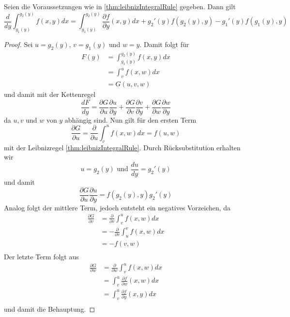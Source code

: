 \begin{theorem}
 Seien die Voraussetzungen wie in \ref{thm:leibnizIntegralRule} gegeben. Dann gilt
 \begin{equation}
  \frac{d}{dy}\int_{g_1(y)}^{g_2(y)}f(x,y) dx =\int_{g_1(y)}^{g_2(y)} \frac{\partial f}{\partial y}(x,y) dx + g_2'(y)f(g_2(y),y) - g_1'(y)f(g_1(y),y)
 \end{equation}
 \begin{proof}
  Sei $u = g_2(y)$, $v = g_1(y)$ und $w=y$. Damit folgt für 
  \[
  \begin{aligned}
       F(y) &=  \int_{g_1(y)}^{g_2(y)}f(x,y) dx\\
	    &=  \int_{v}^{u}f(x,w) dx\\
	    &= G(u,v,w)
  \end{aligned}
  \]
und damit mit der Kettenregel
\[
 \frac{dF}{dy} = \frac{\partial G}{\partial u}\frac{\partial u}{\partial y} + \frac{\partial G}{\partial v}\frac{\partial v}{\partial y}+ \frac{\partial G}{\partial w}\frac{\partial w}{\partial y}
\]
da $u, v$ und $w$ von $y$ abhängig sind.
Nun gilt für den ersten Term 
\[
  \frac{\partial G}{\partial u} = \frac{\partial}{\partial u} \int_v^u f(x,w)dx = f(u,w)
\]
mit der Leibnizregel \ref{thm:leibnizIntegralRule}. Durch Rücksubstitution erhalten wir
\[
 u = g_2(y) \text{ und } \frac{du}{dy} = g_2'(y)
\]
und damit 
\[
  \frac{\partial G}{\partial u}\frac{\partial u}{\partial y}  = f(g_2(y),y)g_2'(y)
\]
Analog folgt der mittlere Term, jedoch entsteht ein negatives Vorzeichen, da
\[
\begin{aligned}
  \frac{\partial G}{\partial v} &= \frac{\partial}{\partial v} \int_v^u f(x,w)dx \\
				&= -\frac{\partial}{\partial v} \int_u^v f(x,w)dx \\
				&= -f(v,w) \\
\end{aligned}
\]
Der letzte Term folgt aus
\[
\begin{aligned}
 \frac{\partial G}{\partial w} &= \frac{\partial}{\partial w} \int_v^u f(x,w)dx  \\
			      &= \int_{v}^{u} \frac{\partial f}{\partial w}(x,w)dx \\
			      &= \int_{v}^{u} \frac{\partial f}{\partial y}(x,y)dx \\
\end{aligned}
 \]
und damit die Behauptung.
 \end{proof}


\end{theorem}

 
